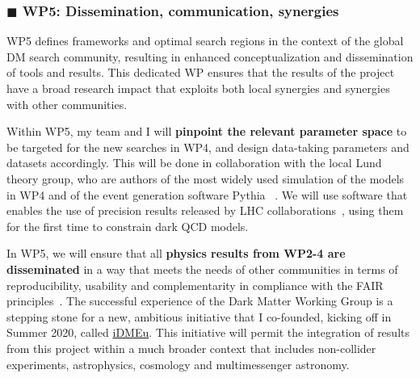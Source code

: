 \documentclass[11pt,a4paper]{article}
\begin{document}
\subsubsection*{\color{violet} $\blacksquare$ \color{black} WP5: Dissemination, communication, synergies}

WP5 defines frameworks and optimal search regions in the context of the global DM search community, resulting in enhanced conceptualization and dissemination of tools and results.
This dedicated WP ensures that the results of the project have a broad research impact that exploits both local synergies and synergies with other communities. 

Within WP5, my team and I will \textbf{pinpoint the relevant parameter space} to be targeted for the new searches in WP4, and design data-taking parameters and datasets accordingly. 
This will be done in collaboration with the local Lund theory group, who are authors of the most widely used simulation of the models in WP4 and of the event generation software Pythia ~\cite{Sjostrand:2014zea}. 
We will use software that enables the use of precision results released by LHC collaborations~\cite{Butterworth:2016sqg}, using them for the first time to constrain dark QCD models. 

In WP5, we will ensure that all \textbf{physics results from WP2-4 are disseminated} in a way that meets the needs of other communities in terms of reproducibility, usability and complementarity in compliance with the FAIR principles~\cite{FAIR}. 
The successful experience of the Dark Matter Working Group is a stepping stone for a new, ambitious initiative that I co-founded, kicking off in Summer 2020, called \href{https://indico.cern.ch/e/iDMEu}{iDMEu}.
This initiative will permit the integration of results from this project within a much broader context that includes non-collider experiments, astrophysics, cosmology and multimessenger astronomy. 
\end{document}
